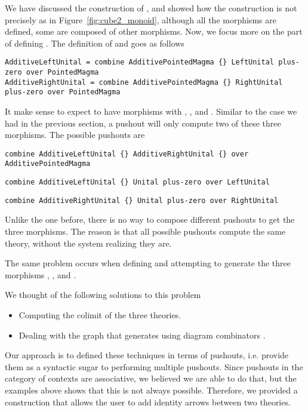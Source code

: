 We have discussed the construction of , and showed how the construction is not precisely as in Figure~\ref{fig:cube2_monoid}, although all the morphisms are defined, some are composed of other morphisms. Now, we focus more on the part of defining . The definition of  and  goes as follows 
\begin{lstlisting}
AdditiveLeftUnital = combine AdditivePointedMagma {} LeftUnital plus-zero over PointedMagma
AdditiveRightUnital = combine AdditivePointedMagma {} RightUnital plus-zero over PointedMagma
\end{lstlisting} 
It make sense to expect  to have morphisms with , , and . Similar to the case we had in the previous section, a pushout will only compute two of these three morphisms. The possible pushouts are 
\begin{lstlisting}
combine AdditiveLeftUnital {} AdditiveRightUnital {} over AdditivePointedMagma
\end{lstlisting}

\begin{lstlisting}
combine AdditiveLeftUnital {} Unital plus-zero over LeftUnital 
\end{lstlisting}

\begin{lstlisting}
combine AdditiveRightUnital {} Unital plus-zero over RightUnital 
\end{lstlisting}

Unlike the one before, there is no way to compose different pushouts to get the three morphisms. The reason is that all possible pushouts compute the same theory, without the system realizing they are. 

The same problem occurs when defining  and attempting to generate the three morphisms 
, 
, and 
. 

We thought of the following solutions to this problem 
\begin{itemize}
    \item Computing the colimit of the three theories. 
    \item Dealing with the graph that generates  using diagram combinators . 
\end{itemize}
Our approach is to defined these techniques in terms of pushouts, i.e. provide them as a syntactic sugar to performing multiple pushouts. Since pushouts in the category of contexts are associative, we believed we are able to do that, but the examples above shows that this is not always possible. Therefore, we provided a construction that allows the user to add identity arrows between two theories. 




